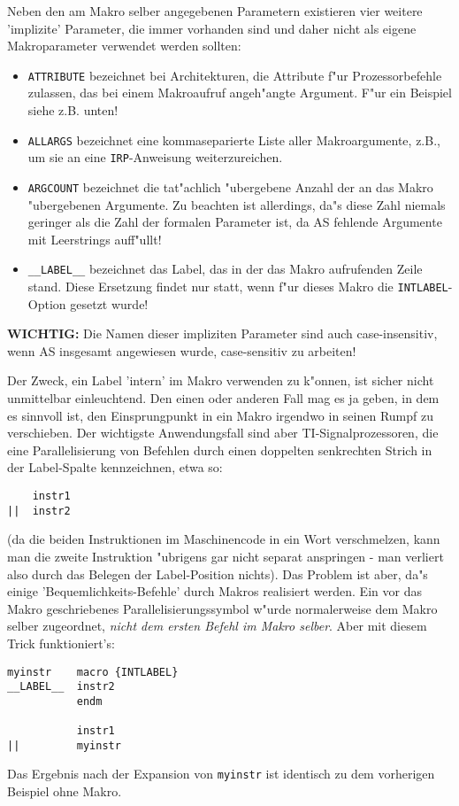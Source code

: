 \documentclass[12pt,a4paper,twoside]{report}
\begin{document}
\par
Neben den am Makro selber angegebenen Parametern existieren vier weitere
'implizite' Parameter, die immer vorhanden sind und daher nicht als eigene
Makroparameter verwendet werden sollten:
\begin{itemize}
\item{{\tt ATTRIBUTE} bezeichnet bei Architekturen, die Attribute f"ur
      Prozessorbefehle zulassen, das bei einem Makroaufruf angeh"angte
      Argument.  F"ur ein Beispiel siehe z.B. unten!}
\item{{\tt ALLARGS} bezeichnet eine kommaseparierte Liste aller
      Makroargumente, z.B., um sie an eine {\tt IRP}-Anweisung
      weiterzureichen.}
\item{{\tt ARGCOUNT} bezeichnet die tat"achlich "ubergebene Anzahl der
      an das Makro "ubergebenen Argumente.  Zu beachten ist allerdings,
      da"s diese Zahl niemals geringer als die Zahl der formalen Parameter
      ist, da AS fehlende Argumente mit Leerstrings auff"ullt!}
\item{{\tt \_\_LABEL\_\_} bezeichnet das Label, das in der das Makro aufrufenden
      Zeile stand.  Diese Ersetzung findet nur statt, wenn f"ur dieses
      Makro die {\tt INTLABEL}-Option gesetzt wurde!}
\end{itemize}
{\bf WICHTIG:} Die Namen dieser impliziten Parameter sind auch
case-insensitiv, wenn AS insgesamt angewiesen wurde, case-sensitiv
zu arbeiten!

Der Zweck, ein Label 'intern' im Makro verwenden zu k"onnen, ist sicher
nicht unmittelbar einleuchtend.  Den einen oder anderen Fall mag es ja
geben, in dem es sinnvoll ist, den Einsprungpunkt in ein Makro irgendwo
in seinen Rumpf zu verschieben.  Der wichtigste Anwendungsfall sind aber
TI-Signalprozessoren, die eine Parallelisierung von Befehlen durch einen
doppelten senkrechten Strich in der Label-Spalte kennzeichnen, etwa so:
\begin{verbatim}
    instr1
||  instr2
\end{verbatim}
(da die beiden Instruktionen im Maschinencode in ein Wort verschmelzen,
kann man die zweite Instruktion "ubrigens gar nicht separat anspringen -
man verliert also durch das Belegen der Label-Position nichts).  Das
Problem ist aber, da"s einige 'Bequemlichkeits-Befehle' durch Makros
realisiert werden.  Ein vor das Makro geschriebenes
Parallelisierungssymbol w"urde normalerweise dem Makro selber zugeordnet,
{\it nicht dem ersten Befehl im Makro selber}.  Aber mit diesem Trick
funktioniert's:
\begin{verbatim}
myinstr    macro {INTLABEL}
__LABEL__  instr2
           endm

           instr1
||         myinstr
\end{verbatim}
Das Ergebnis nach der Expansion von {\tt myinstr} ist identisch zu dem
vorherigen Beispiel ohne Makro.
\end{document}
